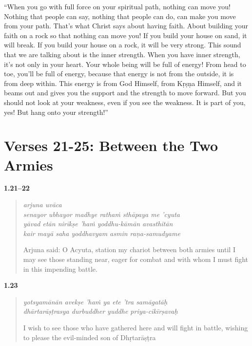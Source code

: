 \enquote{When you go with full force on your spiritual path, nothing can move you! Nothing that people can say, nothing that people can do, can make you move from your path. That’s what Christ says about having faith. About building your faith on a rock so that nothing can move you! If you build your house on sand, it will break. If you build your house on a rock, it will be very strong. This sound that we are talking about is the inner strength. When you have inner strength, it’s not only in your heart. Your whole being will be full of energy! From head to toe, you’ll be full of energy, because that energy is not from the outside, it is from deep within. This energy is from God Himself, from Kṛṣṇa Himself, and it beams out and gives you the support and the strength to move forward. But you should not look at your weakness, even if you see the weakness. It is part of you, yes! But hang onto your strength!}

\newpage
\section{Verses 21-25: Between the Two Armies}\label{sec-verses-21-25-between-the-two-armies}


\par\noindent\textbf{1.21–22}\par
\begin{verse}
\textit{arjuna uvāca} \\
\textit{senayor ubhayor madhye rathaṁ sthāpaya me ’cyuta} \\
\textit{yāvad etān nirīkṣe ’haṁ yoddhu-kāmān avasthitān} \\
\textit{kair mayā saha yoddhavyam asmin raṇa-samudyame}

\noindent Arjuna said: O Acyuta, station my chariot between both armies until I may see those standing near, eager for combat and with whom I must fight in this impending battle.
\end{verse}
\par



\par\noindent\textbf{1.23}\par
\begin{verse}
\textit{yotsyamānān avekṣe ’haṁ ya ete ’tra samāgatāḥ} \\
\textit{dhārtarāṣṭrasya durbuddher yuddhe priya-cikīrṣavaḥ}

\noindent I wish to see those who have gathered here and will fight in battle, wishing to please the evil-minded son of Dhṛtarāṣṭra
\end{verse}
\par




